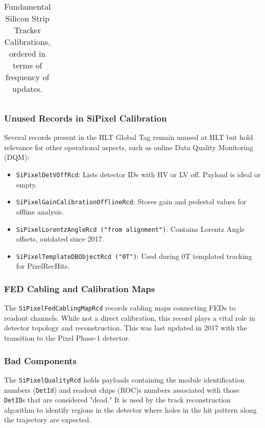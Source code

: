 \begin{table}[h!]
\begin{adjustbox}{max width=\textwidth}
\begin{tabular}{p{2.5cm}|p{5.7cm}|p{1.5cm}|p{2.5cm}|p{3.0cm}}
    \end{tabular}
    \end{adjustbox}
    \caption{Fundamental Silicon Strip Tracker Calibrations, ordered in terms of frequency of updates.}
    \label{tab:PixelCalibrations_critical}
\end{table}

\subsubsection{Unused Records in SiPixel Calibration}
Several records present in the HLT Global Tag remain unused at HLT but hold relevance for other operational aspects, such as online Data Quality Monitoring (DQM):
\begin{itemize}
    \item \texttt{SiPixelDetVOffRcd}: Lists detector IDs with HV or LV off. Payload is ideal or empty.
    \item \texttt{SiPixelGainCalibrationOfflineRcd}: Stores gain and pedestal values for offline analysis.
    \item \texttt{SiPixelLorentzAngleRcd ("from alignment")}: Contains Lorentz Angle offsets, outdated since 2017.
    \item \texttt{SiPixelTemplateDBObjectRcd ("0T")}: Used during 0T templated tracking for PixelRecHits.
\end{itemize}

\subsubsection{FED Cabling and Calibration Maps}
The \texttt{SiPixelFedCablingMapRcd} records cabling maps connecting FEDs to readout channels. While not a direct calibration, this record plays a vital role in detector topology and reconstruction. This was last updated in 2017 with the transition to the Pixel Phase-1 detector.

\subsubsection{Bad Components}
The \texttt{SiPixelQualityRcd} holds payloads containing the module identification numbers (\texttt{DetId}) and readout chips (ROC)s numbers associated with those \texttt{DetID}s that are considered "dead." It is used by the track reconstruction algorithm to identify regions in the detector where holes in the hit pattern along the trajectory are expected.\\


